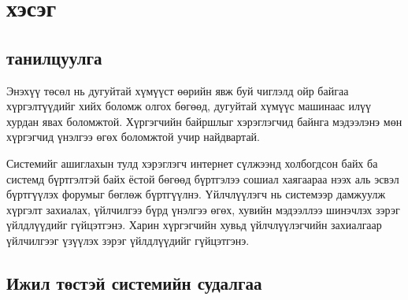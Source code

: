 
\pagecolor{ChapterYellow}
\chapter{\ttitle{} хэсэг} %
\label{Chapter1} %


\newcommand{\keyword}[1]{\textbf{#1}}
\newcommand{\tabhead}[1]{\textbf{#1}}
\newcommand{\code}[1]{\texttt{#1}}
\newcommand{\file}[1]{\texttt{\bfseries#1}}
\newcommand{\option}[1]{\texttt{\itshape#1}}


\pagecolor{white}
\section{\ttitle{} танилцуулга}

Энэхүү төсөл нь дугуйтай хүмүүст өөрийн явж буй чиглэлд ойр байгаа хүргэлтүүдийг хийх боломж олгох бөгөөд, дугуйтай хүмүүс машинаас илүү хурдан явах боломжтой. Хүргэгчийн байршлыг хэрэглэгчид байнга мэдээлэнэ мөн хүргэгчид үнэлгээ өгөх боломжтой учир найдвартай.

Системийг ашиглахын тулд хэрэглэгч интернет сүлжээнд холбогдсон байх ба системд бүртгэлтэй байх ёстой бөгөөд бүртгэлээ сошиал хаягаараа нээх аль эсвэл бүртгүүлэх форумыг бөглөж бүртгүүлнэ. Үйлчлүүлэгч нь системээр дамжуулж хүргэлт захиалах, үйлчилгээ бүрд үнэлгээ өгөх, хувийн мэдээллээ шинэчлэх зэрэг үйлдлүүдийг гүйцэтгэнэ. Харин хүргэгчийн хувьд үйлчлүүлэгчийн захиалгаар үйлчилгээг үзүүлэх зэрэг үйлдлүүдийг гүйцэтгэнэ.

\section{Ижил төстэй системийн судалгаа}


